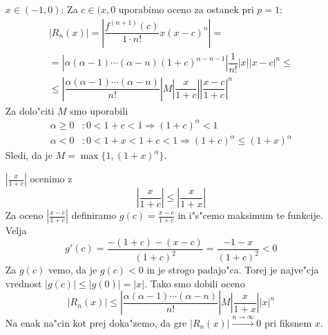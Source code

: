 \begin{enumerate}
\begin{itemize}
        \item[$x \in (-1, 0)$:] Za $c \in (x, 0$ uporabimo oceno za ostanek pri $p = 1$:
        \begin{multline*}
         |R_n(x)| = \left| \dfrac{f^{(n+1)} (c)}{1 \cdot n!} x (x-c)^n \right| = \\
         = \left| \alpha (\alpha - 1) \cdots (\alpha -n) (1+c)^{\alpha -n -1} \right| \dfrac{1}{n!} |x| |x-c|^n \leq \\
         \leq \left| \dfrac{\alpha (\alpha - 1) \cdots (\alpha - n)}{n!} \right| M \left| \dfrac{x}{1+c} \right| \left| \dfrac{x-c}{1+c} \right|^n
        \end{multline*}
        Za dolo"citi $M$ smo uporabili
        \begin{align*}
        \alpha \geq 0&: 0 < 1 + c < 1 \Rightarrow (1 + c)^\alpha < 1\\
        \alpha < 0 &: 0 < 1 + x < 1 + c < 1 \Rightarrow (1+c)^\alpha \leq (1 + x)^\alpha
        \end{align*}
        Sledi, da je $M = \max \{ 1, (1+x)^\alpha \}$.
        
        $\left| \frac{x}{1+c} \right|$ ocenimo z
        \begin{equation*}
        \left| \dfrac{x}{1+c} \right| \leq \left| \dfrac{x}{1+x} \right|
        \end{equation*}
        Za oceno $\left| \frac{x - c}{1+c} \right|$ definiramo $g(c) = \frac{x - c}{1 + c}$ in i"s"cemo maksimum te funkcije. Velja
        \begin{equation*}
        g'(c) = \dfrac{-(1+c) - (x - c)}{(1+c)^2} = \dfrac{-1 - x}{(1 + c)^2} < 0
        \end{equation*}
       Za $g(c)$ vemo, da je $g(c) < 0$ in je strogo padajo"ca. Torej je najve"cja vrednost $|g(c)| \leq |g(0)| = |x|$. Tako smo dobili oceno
       \begin{equation*}
       |R_n(x)| \leq \left| \dfrac{\alpha (\alpha - 1) \cdots (\alpha - n)}{n!} \right| M \left| \dfrac{x}{1+x} \right| |x|^n
       \end{equation*}
       Na enak na"cin kot prej doka"zemo, da gre $|R_n(x)| \stackrel{n \to \infty}{\longrightarrow} 0$ pri fiksnem $x$.
    \end{itemize}
\end{enumerate}
